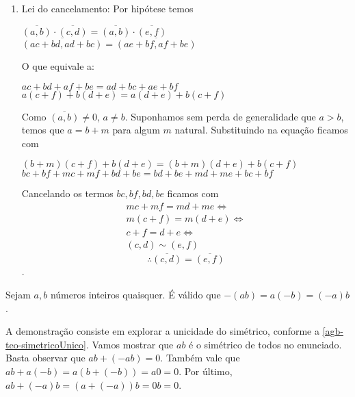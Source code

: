 \documentclass[../main.tex]{subfiles}
\begin{document}
\begin{dem}
\begin{enumerate}[label=(\roman*)]
        \item Lei do cancelamento: Por hipótese temos 
        \begin{center}
            $\overline{(a,b)} \cdot \overline{(c,d)} = \overline{(a,b)} \cdot \overline{(e,f)}$ \\
            $\overline{(ac+bd, ad+bc)} = \overline{(ae+bf, af+be)}$
        \end{center}
        O que equivale a: 
        \begin{center}
            $ac+bd+af+be = ad+bc+ae+bf$ \\
             $a(c+f) + b(d+e) = a(d+e) + b(c+f)$
        \end{center}
        Como $\overline{(a,b)} \neq 0$, $a \neq b$. Suponhamos sem perda de generalidade que $a > b$, temos que $a = b + m$ para algum $m$ natural. Substituindo na equação ficamos com 
        \begin{center}
            $(b+m)(c+f)+ b(d+e) = (b+m)(d+e)+b(c+f)$ \\
            $bc + bf + mc + mf + bd + be = bd + be + md + me + bc + bf$
        \end{center}
        Cancelando os termos $bc, bf, bd, be$ ficamos com
        \[\begin{split}
             mc + mf = md + me \iff \\
            m(c+f) = m(d+e) \iff \\
            c+f = d+e \iff \\
            (c,d) \sim (e,f)           
        \end{split} \]
       $$\therefore \overline{(c,d)} = \overline{(e,f)}$$.

    \end{enumerate}
\end{dem}

\begin{prop}
    Sejam $a, b$ números inteiros quaisquer. É válido que $-(ab) = a(-b) = (-a)b$.
\end{prop}
\begin{dem}
    A demonstração consiste em explorar a unicidade do simétrico, conforme a \cref{agb-teo-simetricoUnico}.
    Vamos mostrar que $ab$ é o simétrico de todos no enunciado. Basta observar que $ab + (-ab) = 0$.
    Também vale que $ab + a(-b) = a(b+(-b)) = a0 = 0$. Por último, $ab + (-a)b = (a + (-a))b = 0b = 0$.
\end{dem}
\end{document}
